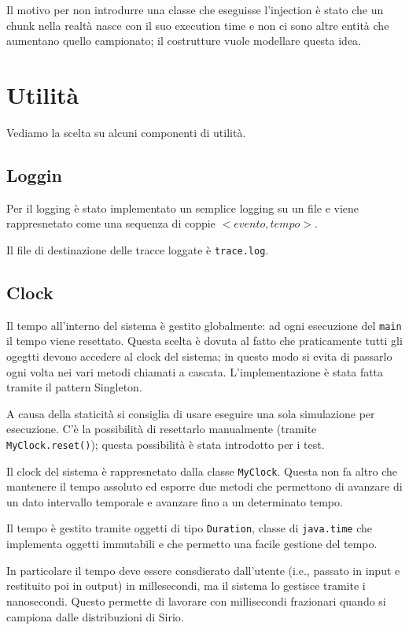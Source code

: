 Il motivo per non introdurre una classe che eseguisse l'injection è stato che un chunk nella realtà nasce con il suo execution time e non ci sono altre entità che aumentano quello campionato; il costrutture vuole modellare questa idea.

\section{Utilità}
Vediamo la scelta su alcuni componenti di utilità.

\subsection{Loggin}
Per il logging è stato implementato un semplice logging su un file e viene rappresnetato come una sequenza di coppie $<evento,tempo>$.

Il file di destinazione delle tracce loggate è \texttt{trace.log}.

\subsection{Clock}
Il tempo all'interno del sistema è gestito globalmente: ad ogni esecuzione del \texttt{main} il tempo viene resettato. Questa scelta è dovuta al fatto che praticamente tutti gli ogegtti devono accedere al clock del sistema; in questo modo si evita di passarlo ogni volta nei vari metodi chiamati a cascata. L'implementazione è stata fatta tramite il pattern Singleton.

A causa della staticità si consiglia di usare eseguire una sola simulazione per esecuzione. C'è la possibilità di resettarlo manualmente (tramite \texttt{MyClock.reset()}); questa possibilità è stata introdotto per i test.

Il clock del sistema è rappresnetato dalla classe \texttt{MyClock}. Questa non fa altro che mantenere il tempo assoluto ed esporre due metodi che permettono di avanzare di un dato intervallo temporale e avanzare fino a un determinato tempo.

\myskip

Il tempo è gestito tramite oggetti di tipo \texttt{Duration}, classe di \texttt{java.time} che implementa oggetti immutabili e che permetto una facile gestione del tempo.

In particolare il tempo deve essere consdierato dall'utente (i.e., passato in input e restituito poi in output) in millesecondi, ma il sistema lo gestisce tramite i nanosecondi. Questo permette di lavorare con millisecondi frazionari quando si campiona dalle distribuzioni di Sirio.

